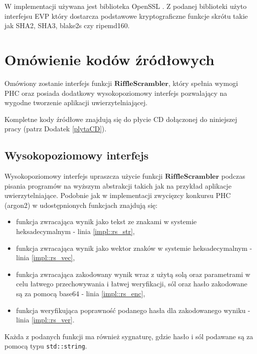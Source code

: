 W implementacji używana jest biblioteka OpenSSL \cite{openssl}.
Z podanej biblioteki użyto interfejsu EVP \cite{opensslevp} który dostarcza podstawowe kryptograficzne funkcje skrótu takie jak SHA2, SHA3, blake2s czy ripemd160.


\section{Omówienie kodów źródłowych}
Omówiony zostanie interfejs funkcji $\mathbf{RiffleScrambler}$, który spełnia wymogi PHC oraz posiada dodatkowy wysokopoziomowy interfejs pozwalający na wygodne tworzenie aplikacji uwierzytelniającej.

Kompletne kody źródłowe znajdują się do płycie CD dołączonej do niniejszej pracy (patrz Dodatek \ref{plytaCD}).

\subsection{Wysokopoziomowy interfejs}
Wysokopoziomowy interfejs upraszcza użycie funkcji $\mathbf{RiffleScrambler}$ podczas pisania
programów na wyższym abstrakcji takich jak na przykład aplikacje uwierzytelniające.
Podobnie jak w implementacji zwycięzcy konkursu PHC (argon2)\cite{arogn2impl} w udostępnionych funkcjach znajdują się:
\begin{itemize}
	\item funkcja zwracająca wynik jako tekst ze znakami w systemie heksadecymalnym - linia \ref{impl::rs_str},
	\item funkcja zwracająca wynik jako wektor znaków w systemie heksadecymalnym - linia \ref{impl::rs_vec},
	\item funkcja zwracająca zakodowany wynik wraz z użytą solą oraz parametrami w celu łatwego przechowywania i łatwej weryfikacji, sól oraz hasło zakodowane są za pomocą base64 \cite{josefsson2006base16} - linia \ref{impl::rs_enc},
	\item funkcja weryfikująca poprawność podanego hasła dla zakodowanego wyniku - linia \ref{impl::rs_ver}.
\end{itemize}

Każda z podanych funkcji ma również sygnaturę, gdzie hasło i sól podawane są za pomocą typu \texttt{std::string}.

